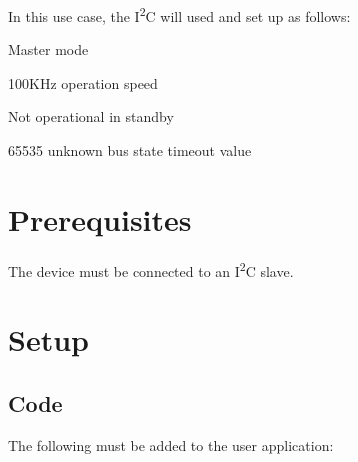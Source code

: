 In this use case, the I\textsuperscript{2}C will used and set up as follows\+:
\begin{DoxyItemize}
\item Master mode
\item 100K\+Hz operation speed
\item Not operational in standby
\item 65535 unknown bus state timeout value
\end{DoxyItemize}\hypertarget{asfdoc_sam0_sercom_i2c_master_callback_use_case_asfdoc_sam0_sercom_i2c_master_callback_use_case_prereq}{}\section{Prerequisites}\label{asfdoc_sam0_sercom_i2c_master_callback_use_case_asfdoc_sam0_sercom_i2c_master_callback_use_case_prereq}
The device must be connected to an I\textsuperscript{2}C slave.\hypertarget{asfdoc_sam0_sercom_i2c_master_callback_use_case_asfdoc_sam0_sercom_i2c_master_callback_use_case_setup}{}\section{Setup}\label{asfdoc_sam0_sercom_i2c_master_callback_use_case_asfdoc_sam0_sercom_i2c_master_callback_use_case_setup}
\hypertarget{asfdoc_sam0_sercom_i2c_master_callback_use_case_asfdoc_sam0_sercom_i2c_master_callback_use_case_setup_code}{}\subsection{Code}\label{asfdoc_sam0_sercom_i2c_master_callback_use_case_asfdoc_sam0_sercom_i2c_master_callback_use_case_setup_code}
The following must be added to the user application\+:


